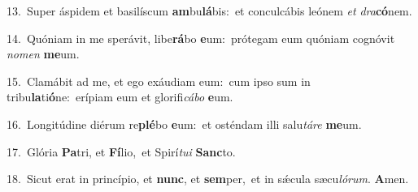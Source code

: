 {\numbfont\textcolor{\numbcolor}{13.}}~Super áspidem et basilíscum \textbf{am}\-bu\-\textbf{lá}\-bis:~\star et conculcábis leónem \textit{et} \textit{dra}\-\textbf{có}nem.\par
{\numbfont\textcolor{\numbcolor}{14.}}~Quóniam in me sperávit, libe\-\textbf{rá}\-bo \textbf{e}\-um:~\star prótegam eum quóniam cognóvit \textit{no}\-\textit{men} \textbf{me}\-um.\par
{\numbfont\textcolor{\numbcolor}{15.}}~Clamábit ad me, et ego exáudiam eum:~\dagger cum ipso sum in tribu\-\textbf{la}\-ti\-\textbf{ó}\-ne:~\star erípiam eum et glorifi\-\textit{cá}\-\textit{bo} \textbf{e}\-um.\par
{\numbfont\textcolor{\numbcolor}{16.}}~Longitúdine diérum re\-\textbf{plé}\-bo \textbf{e}\-um:~\star et osténdam illi salu\-\textit{tá}\-\textit{re} \textbf{me}\-um.\par
{\numbfont\textcolor{\numbcolor}{17.}}~Glória \textbf{Pa}\-tri, et \textbf{Fí}\-lio,~\star et Spirí\-\textit{tu}\-\textit{i} \textbf{Sanc}\-to.\par
{\numbfont\textcolor{\numbcolor}{18.}}~Sicut erat in princípio, et \textbf{nunc}\-, et \textbf{sem}\-per,~\star et in sǽcula sæcu\-\textit{ló}\-\textit{rum}. \textbf{A}\-men.\par
